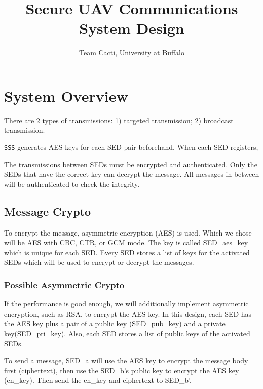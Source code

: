 \documentclass[11pt,oneside,onecolumn,letterpaper]{article}
\title{Secure UAV Communications System Design}
\author{Team Cacti, University at Buffalo}
\date{}
\begin{document}
\normalsize


\maketitle

\renewcommand{\thepage}{System Design, Cacti, UB--\arabic{page}}
\setcounter{page}{1} \normalsize
%

\newcommand{\flagRollback}{\textsf{Rollback}\xspace}

\section{System Overview}

There are 2 types of transmissions: 1) targeted transmission; 2) broadcast transmission.

\verb|SSS| generates AES keys for each SED pair beforehand. 
When each SED registers,

The transmissions between SEDs must be encrypted and authenticated.
Only the SEDs that have the correct key can decrypt the message.
All messages in between will be authenticated to check the integrity.

\subsection{Message Crypto}
To encrypt the message, asymmetric encryption (AES) is used.
Which we chose will be AES with CBC, CTR, or GCM mode.
The key is called SED\_aes\_key which is unique for each SED.
Every SED stores a list of keys for the activated SEDs which will be used to encrypt or decrypt the messages.

\subsubsection{Possible Asymmetric Crypto}
If the performance is good enough, we will additionally implement asymmetric encryption, such as RSA, to encrypt the AES key.
In this design, each SED has the AES key plus a pair of a public key (SED\_pub\_key) and a private key(SED\_pri\_key).
Also, each SED stores a list of public keys of the activated SEDs.

To send a message, SED\_a will use the AES key to encrypt the message body first (ciphertext), then use the SED\_b's public key to encrypt the AES key (en\_key).
Then send the en\_key and ciphertext to SED\_b'.
\end{document}
